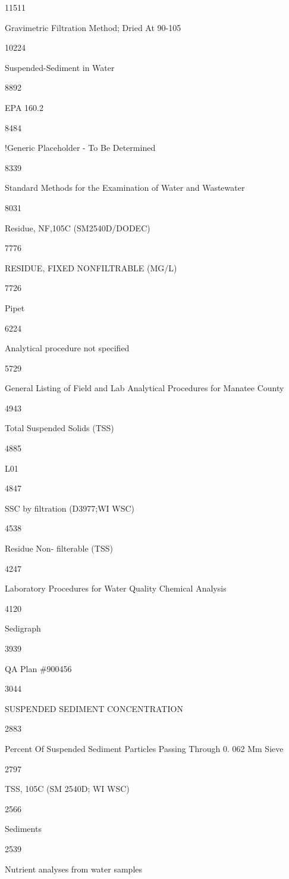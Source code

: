 \documentclass[]{article}
\begin{document}
11511

Gravimetric Filtration Method; Dried At 90-105

10224

Suspended-Sediment in Water

8892

EPA 160.2

8484

!Generic Placeholder - To Be Determined

8339

Standard Methods for the Examination of Water and Wastewater

8031

Residue, NF,105C (SM2540D/DODEC)

7776

RESIDUE, FIXED NONFILTRABLE (MG/L)

7726

Pipet

6224

Analytical procedure not specified

5729

General Listing of Field and Lab Analytical Procedures for Manatee
County

4943

Total Suspended Solids (TSS)

4885

L01

4847

SSC by filtration (D3977;WI WSC)

4538

Residue Non- filterable (TSS)

4247

Laboratory Procedures for Water Quality Chemical Analysis

4120

Sedigraph

3939

QA Plan \#900456

3044

SUSPENDED SEDIMENT CONCENTRATION

2883

Percent Of Suspended Sediment Particles Passing Through 0. 062 Mm Sieve

2797

TSS, 105C (SM 2540D; WI WSC)

2566

Sediments

2539

Nutrient analyses from water samples
\end{document}
